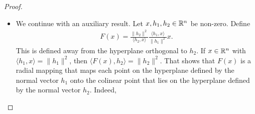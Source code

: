 \documentclass[10pt,a4paper]{article}
\begin{document}
\begin{proof}
\begin{itemize}
        
        \item 
        We continue with an auxiliary result.
        Let $x, h_1, h_2 \in {\mathbb R}^{n}$ be non-zero. 
        Define 
        \begin{align*}
            F(x) 
            = 
            \frac{ \| h_2 \|^{2} }{ \langle h_2, x \rangle }
            \frac{ \langle h_1, x \rangle }{ \| h_1 \|^{2} }
            x
            .
        \end{align*}
        This is defined away from the hyperplane orthogonal to $h_2$.
        If $x \in {\mathbb R}^{n}$ with $\langle h_1, x \rangle = \| h_1 \|^{2}$, then $\langle F(x), h_2 \rangle = \| h_2 \|^{2}$.
        That shows that $F(x)$ is a radial mapping that maps each point on the hyperplane defined by the normal vector $h_1$
        onto the colinear point that lies on the hyperplane defined by the normal vector $h_2$. Indeed, 
        

\end{itemize}
\end{proof}
\end{document}
